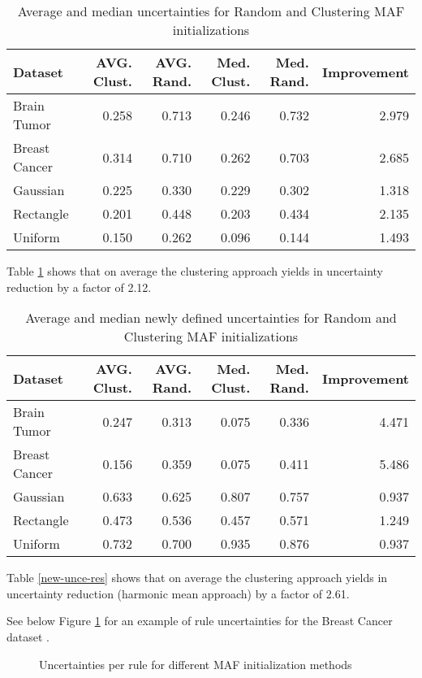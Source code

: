 \documentclass[10pt,a4paper,oneside]{article}
\begin{document}
\begin{table}[htbp]
    \caption{Average and median uncertainties for Random and Clustering MAF initializations}
    \centering
    \label{unc-res}
    \begin{tabular}{l|r|r|r|r|r}
    \toprule
    Dataset & AVG. Clust. & AVG. Rand. & Med. Clust. & Med. Rand. & Improvement \\
    \midrule
    Brain Tumor & 0.258 & 0.713 & 0.246 & 0.732 & 2.979 \\
    Breast Cancer & 0.314 & 0.710 & 0.262 & 0.703 & 2.685 \\
    Gaussian & 0.225 & 0.330 & 0.229 & 0.302 & 1.318 \\
    Rectangle & 0.201 & 0.448 & 0.203 & 0.434 & 2.135 \\
    Uniform & 0.150 & 0.262 & 0.096 & 0.144 & 1.493 \\
    \bottomrule
    \end{tabular}
\end{table}
 Table \ref{unc-res} shows that on average the clustering approach yields in uncertainty reduction by a factor of 2.12.

\newpage
\FloatBarrier
\begin{table}[htbp]
    \caption{Average and median newly defined uncertainties for Random and Clustering MAF initializations}
    \centering
    \label{new-unce-res}
    \begin{tabular}{l|r|r|r|r|r}
    \toprule
    Dataset & AVG. Clust. & AVG. Rand. & Med. Clust. & Med. Rand. & Improvement \\
    \midrule
    Brain Tumor & 0.247 & 0.313 & 0.075 & 0.336 & 4.471 \\
    Breast Cancer & 0.156 & 0.359 & 0.075 & 0.411 & 5.486 \\
    Gaussian & 0.633 & 0.625 & 0.807 & 0.757 & 0.937 \\
    Rectangle & 0.473 & 0.536 & 0.457 & 0.571 & 1.249 \\
    Uniform & 0.732 & 0.700 & 0.935 & 0.876 & 0.937 \\
    \bottomrule
    \end{tabular}
    \label{tab:my_label}
\end{table}

Table \ref{new-unce-res} shows that on average the clustering approach yields in uncertainty reduction (harmonic mean approach) by a factor of 2.61.

{\color{black}
See below Figure \ref{fig:bars} for an example of rule uncertainties for the Breast Cancer dataset \cite{breastCancer}.
}
\FloatBarrier
\begin{figure}[htbp]
    \caption{Uncertainties per rule for different MAF initialization methods}
    \label{fig:bars}
\end{figure}
\end{document}
